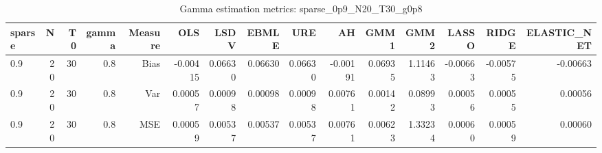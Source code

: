 \begin{table}[!htbp]\centering
\caption{Gamma estimation metrics: sparse_0p9_N20_T30_g0p8}
\label{tab:table1_sparse_0p9_N20_T30_g0p8}
\begin{tabular}{lrrrrrrrrrrrrrr}
\hline
sparse & N & T0 & gamma & Measure & OLS & LSDV & EBMLE & URE & AH & GMM1 & GMM2 & LASSO & RIDGE & ELASTIC_NET \\
\hline
0.9 & 20 & 30 & 0.8 & Bias & -0.00415 & 0.06630 & 0.06630 & 0.06630 & -0.00191 & 0.06935 & 1.11463 & -0.00663 & -0.00575 & -0.00663 \\
0.9 & 20 & 30 & 0.8 & Var & 0.00057 & 0.00098 & 0.00098 & 0.00098 & 0.00761 & 0.00142 & 0.08993 & 0.00056 & 0.00055 & 0.00056 \\
0.9 & 20 & 30 & 0.8 & MSE & 0.00059 & 0.00537 & 0.00537 & 0.00537 & 0.00761 & 0.00623 & 1.33234 & 0.00060 & 0.00059 & 0.00060 \\
\hline
\end{tabular}
\end{table}

